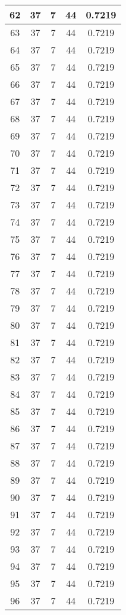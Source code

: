 \documentclass[letterpaper, 12pt]{article}
\begin{document}
\begin{longtable}{|c|c|c|c|c|}
\hline
62 & 37 & 7 & 44 & 0.7219 \\
\hline
63 & 37 & 7 & 44 & 0.7219 \\
\hline
64 & 37 & 7 & 44 & 0.7219 \\
\hline
65 & 37 & 7 & 44 & 0.7219 \\
\hline
66 & 37 & 7 & 44 & 0.7219 \\
\hline
67 & 37 & 7 & 44 & 0.7219 \\
\hline
68 & 37 & 7 & 44 & 0.7219 \\
\hline
69 & 37 & 7 & 44 & 0.7219 \\
\hline
70 & 37 & 7 & 44 & 0.7219 \\
\hline
71 & 37 & 7 & 44 & 0.7219 \\
\hline
72 & 37 & 7 & 44 & 0.7219 \\
\hline
73 & 37 & 7 & 44 & 0.7219 \\
\hline
74 & 37 & 7 & 44 & 0.7219 \\
\hline
75 & 37 & 7 & 44 & 0.7219 \\
\hline
76 & 37 & 7 & 44 & 0.7219 \\
\hline
77 & 37 & 7 & 44 & 0.7219 \\
\hline
78 & 37 & 7 & 44 & 0.7219 \\
\hline
79 & 37 & 7 & 44 & 0.7219 \\
\hline
80 & 37 & 7 & 44 & 0.7219 \\
\hline
81 & 37 & 7 & 44 & 0.7219 \\
\hline
82 & 37 & 7 & 44 & 0.7219 \\
\hline
83 & 37 & 7 & 44 & 0.7219 \\
\hline
84 & 37 & 7 & 44 & 0.7219 \\
\hline
85 & 37 & 7 & 44 & 0.7219 \\
\hline
86 & 37 & 7 & 44 & 0.7219 \\
\hline
87 & 37 & 7 & 44 & 0.7219 \\
\hline
88 & 37 & 7 & 44 & 0.7219 \\
\hline
89 & 37 & 7 & 44 & 0.7219 \\
\hline
90 & 37 & 7 & 44 & 0.7219 \\
\hline
91 & 37 & 7 & 44 & 0.7219 \\
\hline
92 & 37 & 7 & 44 & 0.7219 \\
\hline
93 & 37 & 7 & 44 & 0.7219 \\
\hline
94 & 37 & 7 & 44 & 0.7219 \\
\hline
95 & 37 & 7 & 44 & 0.7219 \\
\hline
96 & 37 & 7 & 44 & 0.7219 \\

\end{longtable}
\end{document}
